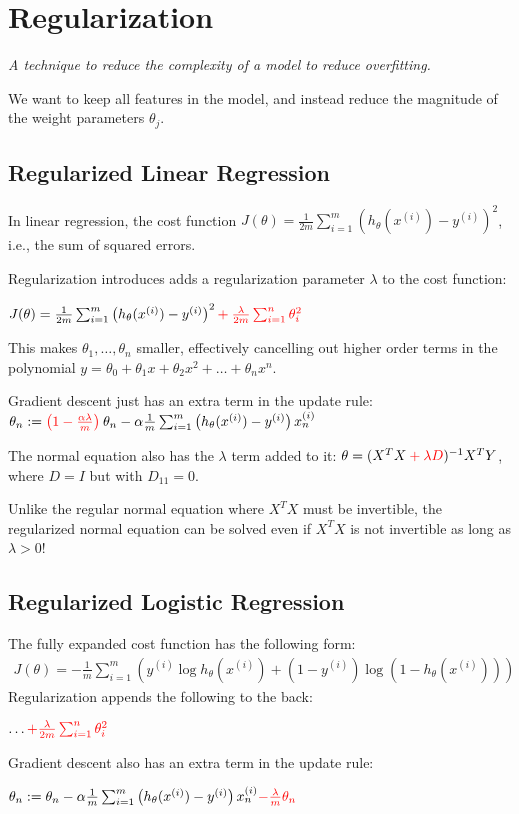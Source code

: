 \section{Regularization}
\emph{A technique to reduce the complexity of a model to reduce overfitting.}

We want to keep all features in the model, and instead reduce the magnitude of the weight parameters
$\theta_j$.

\subsection{Regularized Linear Regression}
In linear regression, the cost function 
$J(\theta) = \frac{1}{2m} \sum_{i=1}^{m} \left(h_\theta(x^{(i)}) - y^{(i)}\right)^2$,
i.e., the sum of squared errors.

Regularization introduces adds a regularization parameter $\lambda$ to the cost function:

$J(\theta) = \frac{1}{2m} \sum_{i=1}^{m} \left(h_\theta(x^{(i)}) - y^{(i)}\right)^2 
\color{red} {+ \: \frac{\lambda}{2m} \sum_{i=1}^{n} \theta_i^2}$

This makes $\theta_1, \dots, \theta_n$ smaller, effectively cancelling out higher order terms in
the polynomial $y = \theta_0 + \theta_1 x + \theta_2 x^2 + \dots + \theta_n x^n$.

Gradient descent just has an extra term in the update rule:
$\theta_n := \textcolor{red}{\left( 1 - \frac{\alpha\lambda}{m}  \right)} \: \theta_n 
- \alpha \frac{1}{m} \sum_{i=1}^{m} \left( h_\theta(x^{(i)}) - y^{(i)} \right) x_n^{(i)}$

The normal equation also has the $\lambda$ term added to it:
$\theta = (X^TX \textcolor{red}{\:+\:\lambda D})^{-1} X^TY$, where $D = I$ but with $D_{11} = 0$.

Unlike the regular normal equation where $X^TX$ must be invertible,
the regularized normal equation can be solved even if $X^TX$ is not invertible
as long as $\lambda > 0$!

\subsection{Regularized Logistic Regression}
The fully expanded cost function has the following form:
\begin{align*}
    J(\theta) = 
    -\frac{1}{m} \sum_{i=1}^{m} \left(
        y^{(i)} \log h_\theta(x^{(i)}) +
        (1 - y^{(i)}) \log\left(1 - h_\theta(x^{(i)}) \right)
    \right)
\end{align*}
Regularization appends the following to the back:

$\dots \textcolor{red}{+ \frac{\lambda}{2m} \sum_{i=1}^{n} \theta_i^2}$

Gradient descent also has an extra term in the update rule:

$\theta_n := \theta_n - \alpha \frac{1}{m} \sum_{i=1}^{m} 
    \left( h_\theta(x^{(i)}) - y^{(i)} \right) x_n^{(i)}
    \textcolor{red}{- \frac{\lambda}{m} \theta_n}$
